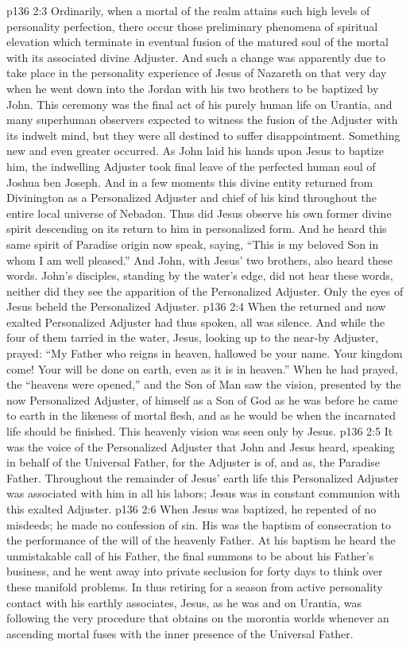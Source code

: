 \vs p136 2:3 Ordinarily, when a mortal of the realm attains such high levels of personality perfection, there occur those preliminary phenomena of spiritual elevation which terminate in eventual fusion of the matured soul of the mortal with its associated divine Adjuster. And such a change was apparently due to take place in the personality experience of Jesus of Nazareth on that very day when he went down into the Jordan with his two brothers to be baptized by John. This ceremony was the final act of his purely human life on Urantia, and many superhuman observers expected to witness the fusion of the Adjuster with its indwelt mind, but they were all destined to suffer disappointment. Something new and even greater occurred. As John laid his hands upon Jesus to baptize him, the indwelling Adjuster took final leave of the perfected human soul of Joshua ben Joseph. And in a few moments this divine entity returned from Divinington as a Personalized Adjuster and chief of his kind throughout the entire local universe of Nebadon. Thus did Jesus observe his own former divine spirit descending on its return to him in personalized form. And he heard this same spirit of Paradise origin now speak, saying, “This is my beloved Son in whom I am well pleased.” And John, with Jesus’ two brothers, also heard these words. John’s disciples, standing by the water’s edge, did not hear these words, neither did they see the apparition of the Personalized Adjuster. Only the eyes of Jesus beheld the Personalized Adjuster.
\vs p136 2:4 \pc When the returned and now exalted Personalized Adjuster had thus spoken, all was silence. And while the four of them tarried in the water, Jesus, looking up to the near\hyp{}by Adjuster, prayed: \textcolor{ubdarkred}{“My Father who reigns in heaven, hallowed be your name. Your kingdom come! Your will be done on earth, even as it is in heaven.”} When he had prayed, the “heavens were opened,” and the Son of Man saw the vision, presented by the now Personalized Adjuster, of himself as a Son of God as he was before he came to earth in the likeness of mortal flesh, and as he would be when the incarnated life should be finished. This heavenly vision was seen only by Jesus.
\vs p136 2:5 It was the voice of the Personalized Adjuster that John and Jesus heard, speaking in behalf of the Universal Father, for the Adjuster is of, and as, the Paradise Father. Throughout the remainder of Jesus’ earth life this Personalized Adjuster was associated with him in all his labors; Jesus was in constant communion with this exalted Adjuster.
\vs p136 2:6 \pc When Jesus was baptized, he repented of no misdeeds; he made no confession of sin. His was the baptism of consecration to the performance of the will of the heavenly Father. At his baptism he heard the unmistakable call of his Father, the final summons to be about his Father’s business, and he went away into private seclusion for forty days to think over these manifold problems. In thus retiring for a season from active personality contact with his earthly associates, Jesus, as he was and on Urantia, was following the very procedure that obtains on the morontia worlds whenever an ascending mortal fuses with the inner presence of the Universal Father.
